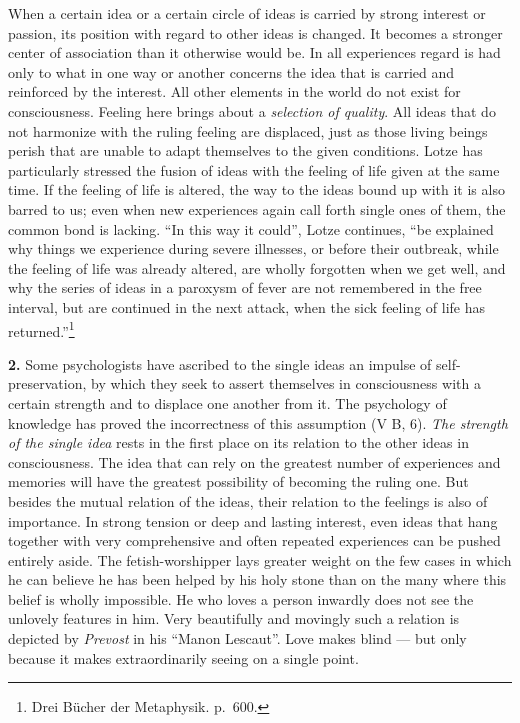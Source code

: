 \documentclass[12pt,a4paper]{book}
\newcommand{\opage}[1]{\marginnote{\footnotesize\textit{[#1]}}}
\begin{document}
When a certain idea or a certain circle of ideas is carried by strong
interest or passion, its position with regard to other ideas is
changed. It becomes a stronger center of association than it otherwise
would be. In all experiences regard is had only to what in one way or
another concerns the idea that is carried and reinforced by the
interest. All other elements in the world do not exist for
consciousness. Feeling here brings about a \emph{selection of quality}.
All ideas that do not harmonize with the ruling feeling are displaced,
just as those living beings perish that are unable to adapt themselves
to the given conditions. Lotze has particularly stressed the fusion of
ideas with the feeling of life given at the same time. If the feeling
of life is altered, the way to the ideas bound up with it is also
barred to us; even when new experiences again call forth single ones of
them, the common bond is lacking. ``In this way it could'', Lotze
continues, ``be explained why things we experience during severe
illnesses, or before their outbreak, while the feeling of life was
already altered, are wholly forgotten when we get well, and why the
series of ideas in a paroxysm of fever are not remembered in the free
interval, but are continued in the next attack, when the sick feeling
of life has returned.''\footnote{Drei Bücher der Metaphysik. p.~600.}

\textbf{2.} Some psychologists have ascribed to the single ideas an
impulse of self-preservation, by which they seek to assert themselves in
consciousness with a certain strength and to displace one another from
it. The psychology of knowledge has proved the incorrectness of this
assumption (V B, 6). \emph{The strength of the single idea} rests in
the first place on its relation
\opage{354}to the other ideas in consciousness. The idea that can rely
on the greatest number of experiences and memories will have the
greatest possibility of becoming the ruling one. But besides the mutual
relation of the ideas, their relation to the feelings is also of
importance. In strong tension or deep and lasting interest, even ideas
that hang together with very comprehensive and often repeated
experiences can be pushed entirely aside. The fetish-worshipper lays
greater weight on the few cases in which he can believe he has been
helped by his holy stone than on the many where this belief is wholly
impossible. He who loves a person inwardly does not see the unlovely
features in him. Very beautifully and movingly such a relation is
depicted by \emph{Prevost} in his ``Manon Lescaut''. Love makes blind
--- but only because it makes extraordinarily seeing on a single point.
\end{document}
